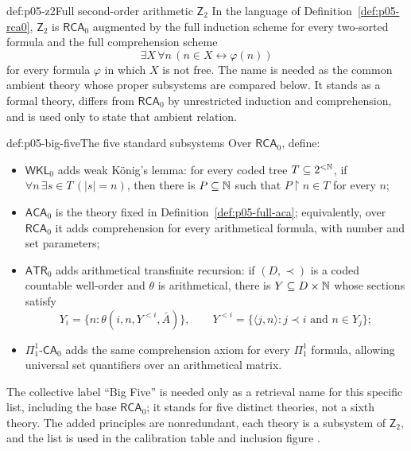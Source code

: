 \begin{hbdefinition}{def:p05-z2}{Full second-order arithmetic \(\mathsf Z_2\)}
In the language of Definition~\ref{def:p05-rca0}, \(\mathsf Z_2\) is
\(\mathsf{RCA}_0\) augmented by the full induction scheme for every
two-sorted formula and the full comprehension scheme
\[
 \exists X\,\forall n\,(n\in X\leftrightarrow\varphi(n))
\]
for every formula \(\varphi\) in which \(X\) is not free.  The name is needed
as the common ambient theory whose proper subsystems are compared below.  It
stands as a formal theory, differs from \(\mathsf{RCA}_0\) by unrestricted
induction and comprehension, and is used only to state that ambient relation.
\end{hbdefinition}

\begin{hbdefinition}{def:p05-big-five}{The five standard subsystems}
Over \(\mathsf{RCA}_0\), define:
\begin{itemize}
  \item \(\mathsf{WKL}_0\) adds weak K\"onig's lemma: for every coded tree
        \(T\subseteq2^{<\mathbb{N}}\), if
        \(\forall n\,\exists s\in T\,(|s|=n)\), then there is
        \(P\subseteq\mathbb{N}\) such that \(P\upharpoonright n\in T\) for every
        \(n\);
  \item \(\mathsf{ACA}_0\) is the theory fixed in
        Definition~\ref{def:p05-full-aca}; equivalently, over
        \(\mathsf{RCA}_0\) it adds comprehension for every arithmetical
        formula, with number and set parameters;
  \item \(\mathsf{ATR}_0\) adds arithmetical transfinite recursion: if
        \((D,\prec)\) is a coded countable well-order and \(\theta\) is
        arithmetical, there is \(Y\subseteq D\times\mathbb{N}\) whose sections satisfy
        \[
          Y_i=\{n:\theta(i,n,Y^{<i},\bar A)\},
          \qquad
          Y^{<i}=\{\langle j,n\rangle:j\prec i
                         \text{ and }n\in Y_j\};
        \]
  \item \(\Pi^1_1\text{-}\mathsf{CA}_0\) adds the same comprehension axiom
        for every \(\Pi^1_1\) formula, allowing universal set quantifiers over
        an arithmetical matrix.
\end{itemize}
The collective label “Big Five” is needed only as a retrieval name for this
specific list, including the base \(\mathsf{RCA}_0\); it stands for five
distinct theories, not a sixth theory.  The added principles are
nonredundant, each theory is a subsystem of \(\mathsf Z_2\), and the list is
used in the calibration table and inclusion figure \cite{Simpson2009}.
\end{hbdefinition}

